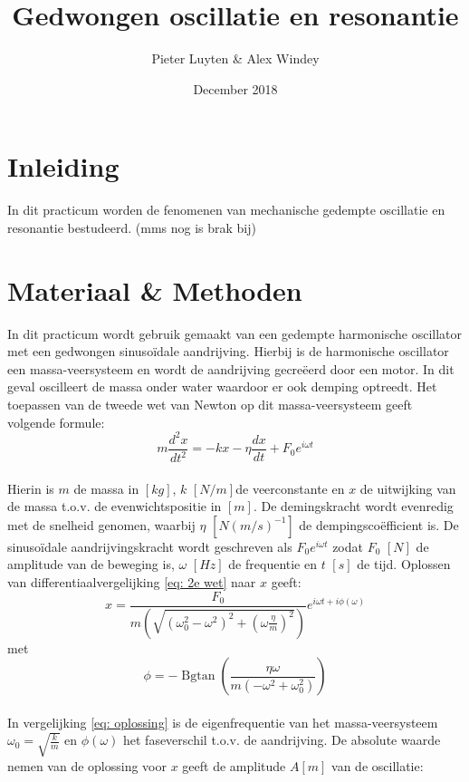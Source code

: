 \documentclass[a4paper]{article}
\title{Gedwongen oscillatie en resonantie}
\author{Pieter Luyten \& Alex Windey }
\date{December 2018}
\begin{document}
\maketitle

\section{Inleiding}
In dit practicum worden de fenomenen van mechanische gedempte oscillatie en resonantie bestudeerd. (mms nog is brak bij)

\section{Materiaal \& Methoden}
In dit practicum wordt gebruik gemaakt van een gedempte harmonische oscillator met een gedwongen sinusoïdale aandrijving. Hierbij is de harmonische oscillator een massa-veersysteem en wordt de aandrijving gecreëerd door een motor. In dit geval oscilleert de massa onder water waardoor er ook demping optreedt. Het toepassen van de tweede wet van Newton op dit massa-veersysteem geeft volgende formule:
\begin{equation}
    m\frac{d^2x}{dt^2} = -kx -\eta \frac{dx}{dt} + F_0 e^{i\omega t}
\label{eq: 2e wet}
\end{equation}
\\
Hierin is $m$ de massa in $[kg]$, $k$ $[N/m]$de veerconstante en $x$ de uitwijking van de massa t.o.v. de evenwichtspositie in $[m]$. De demingskracht wordt evenredig met de snelheid genomen, waarbij $\eta$ $[N (m/s)^{-1}]$ de dempingscoëfficient is. De sinusoïdale aandrijvingskracht wordt geschreven als $F_0 e^{i\omega t}$ zodat $F_0$ $[N]$ de amplitude van de beweging is, $\omega$ $[Hz]$ de frequentie en $t$ $[s]$ de tijd. Oplossen van differentiaalvergelijking \ref{eq: 2e wet} naar $x$ geeft:
\begin{equation}
    x = \frac{F_0}{m\left( \sqrt{(\omega_0^2 - \omega^2)^2 + (\omega\frac{\eta}{m})^2} \right)} e^{i \omega t + i\phi (\omega) }
\label{eq: oplossing}    
\end{equation}
met
\begin{equation}
    \phi = - \operatorname{Bgtan}{\left (\frac{\eta \omega}{m \left(- \omega^{2} + \omega_{0}^{2}\right)} \right )}
    \label{eq:phi}
\end{equation}
\\
In vergelijking \ref{eq: oplossing} is de eigenfrequentie van het massa-veersysteem $\omega_0 = \sqrt{\frac{k}{m}}$ en $\phi(\omega)$ het faseverschil t.o.v. de aandrijving. De absolute waarde nemen van de oplossing voor $x$ geeft de amplitude $A [m]$ van de oscillatie:
\end{document}
